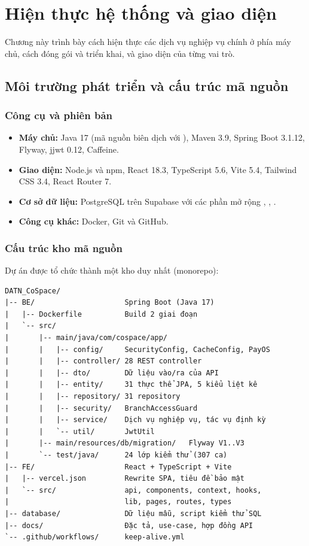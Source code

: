 \chapter{Hiện thực hệ thống và giao diện}
\label{ch:hien-thuc-va-giao-dien}

Chương này trình bày cách hiện thực các dịch vụ nghiệp vụ chính ở phía máy chủ, cách đóng gói và triển khai, và giao diện của từng vai trò.

\section{Môi trường phát triển và cấu trúc mã nguồn}

\subsection{Công cụ và phiên bản}
\begin{itemize}
    \item \textbf{Máy chủ:} Java 17 (mã nguồn biên dịch với ), Maven 3.9, Spring Boot 3.1.12, Flyway, jjwt 0.12, Caffeine.
    \item \textbf{Giao diện:} Node.js và npm, React 18.3, TypeScript 5.6, Vite 5.4, Tailwind CSS 3.4, React Router 7.
    \item \textbf{Cơ sở dữ liệu:} PostgreSQL trên Supabase với các phần mở rộng , , .
    \item \textbf{Công cụ khác:} Docker, Git và GitHub.
\end{itemize}

\subsection{Cấu trúc kho mã nguồn}
Dự án được tổ chức thành một kho duy nhất (monorepo):

\begin{verbatim}
DATN_CoSpace/
|-- BE/                     Spring Boot (Java 17)
|   |-- Dockerfile          Build 2 giai đoạn
|   `-- src/
|       |-- main/java/com/cospace/app/
|       |   |-- config/     SecurityConfig, CacheConfig, PayOS
|       |   |-- controller/ 28 REST controller
|       |   |-- dto/        Dữ liệu vào/ra của API
|       |   |-- entity/     31 thực thể JPA, 5 kiểu liệt kê
|       |   |-- repository/ 31 repository
|       |   |-- security/   BranchAccessGuard
|       |   |-- service/    Dịch vụ nghiệp vụ, tác vụ định kỳ
|       |   `-- util/       JwtUtil
|       |-- main/resources/db/migration/   Flyway V1..V3
|       `-- test/java/      24 lớp kiểm thử (307 ca)
|-- FE/                     React + TypeScript + Vite
|   |-- vercel.json         Rewrite SPA, tiêu đề bảo mật
|   `-- src/                api, components, context, hooks,
|                           lib, pages, routes, types
|-- database/               Dữ liệu mẫu, script kiểm thử SQL
|-- docs/                   Đặc tả, use-case, hợp đồng API
`-- .github/workflows/      keep-alive.yml
\end{verbatim}

